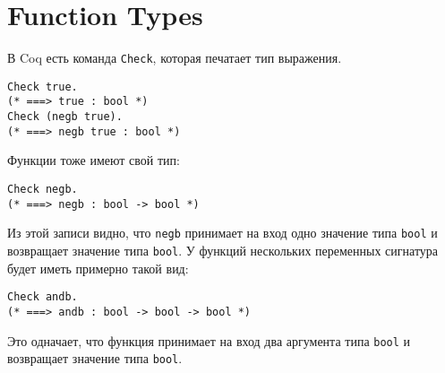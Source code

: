 \documentclass[12pt,a4paper,draft]{article}
\begin{document}
\section{Function Types}
В Coq есть команда \texttt{Check}, которая печатает тип выражения.

\begin{verbatim}
Check true.
(* ===> true : bool *)
Check (negb true).
(* ===> negb true : bool *)
\end{verbatim}

Функции тоже имеют свой тип:

\begin{verbatim}
Check negb.
(* ===> negb : bool -> bool *)
\end{verbatim}

Из этой записи видно, что \texttt{negb} принимает на вход одно значение типа \texttt{bool} и возвращает значение типа \texttt{bool}. У функций нескольких переменных сигнатура будет иметь примерно такой вид:

\begin{verbatim}
Check andb.
(* ===> andb : bool -> bool -> bool *)
\end{verbatim}

Это одначает, что функция принимает на вход два аргумента типа \texttt{bool} и возвращает значение типа \texttt{bool}.
\end{document}
